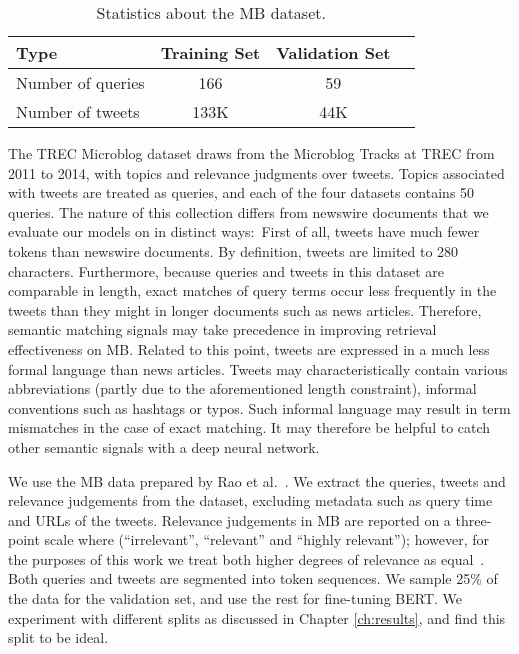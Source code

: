 \begin{table}[t]
\vspace{0.2cm}
\centering
\begin{tabular}{lccc}
\toprule
\textbf{Type} \mbox{\hspace{0.5cm}} & \textbf{Training Set} \mbox{\hspace{1.0cm}} & \textbf{Validation Set} \mbox{\hspace{1.0cm}} \\
\toprule
Number of queries & 166 & 59 \\
Number  of tweets & 133K & 44K  \\
\bottomrule
\end{tabular}
\vspace{0.2cm}
\caption{Statistics about the MB dataset.}
\label{tab:mb-stats}
\end{table}

The TREC Microblog dataset draws from the Microblog Tracks at TREC from 2011 to 2014, with topics and relevance judgments over tweets.
Topics associated with tweets are treated as queries, and each of the four datasets contains 50 queries.
The nature of this collection differs from newswire documents that we evaluate our models on in distinct ways:\
First of all, tweets have much fewer tokens than newswire documents.
By definition, tweets are limited to 280 characters.
Furthermore, because queries and tweets in this dataset are comparable in length, exact matches of query terms occur less frequently in the tweets than they might in longer documents such as news articles.
Therefore, semantic matching signals may take precedence in improving retrieval effectiveness on MB.
Related to this point, tweets are expressed in a much less formal language than news articles.
Tweets may characteristically contain various abbreviations (partly due to the aforementioned length constraint), informal conventions such as hashtags or typos.
Such informal language may result in term mismatches in the case of exact matching.
It may therefore be helpful to catch other semantic signals with a deep neural network.

We use the MB data prepared by Rao et al.~\cite{rao2019tweet}.
We extract the queries, tweets and relevance judgements from the dataset, excluding metadata such as query time and URLs of the tweets.
Relevance judgements in MB are reported on a three-point scale where (``irrelevant'', ``relevant'' and ``highly relevant''); however, for the purposes of this work we treat both higher degrees of relevance as equal~\cite{ounisoverview}.
Both queries and tweets are segmented into token sequences.
We sample 25\% of the data for the validation set, and use the rest for fine-tuning BERT.
We experiment with different splits as discussed in Chapter \ref{ch:results}, and find this split to be ideal.

